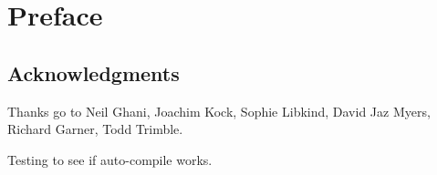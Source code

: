 \documentclass[Book-Poly]{subfiles}
\begin{document}
%


\setcounter{chapter}{-1}%


\chapter*{Preface}\label{chapter.0}


\section*{Acknowledgments}

Thanks go to Neil Ghani, Joachim Kock, Sophie Libkind, David Jaz Myers, Richard Garner, Todd Trimble.

Testing to see if auto-compile works.
\end{document}
